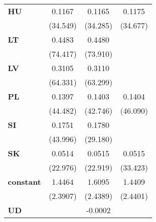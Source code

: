 \documentclass{article}
\begin{document}
\begin{table}[!htbp]
{\begin{tabular}{lccc}
\textbf{HU}            &      0.1167     &         0.1165        &       0.1175       \\
\textbf{ }                     &     (34.549)    &        (34.285)       &      (34.677)      \\
\textbf{LT}            &      0.4483     &         0.4480        &                    \\
\textbf{ }                     &     (74.417)    &        (73.910)       &                    \\
\textbf{LV}            &      0.3105     &         0.3110        &                    \\
\textbf{ }                     &     (64.331)    &        (63.299)       &                    \\
\textbf{PL}            &      0.1397     &         0.1403        &       0.1404       \\
\textbf{ }                     &     (44.482)    &        (42.746)       &      (46.090)      \\
\textbf{SI}            &      0.1751     &         0.1780        &                    \\
\textbf{ }                     &     (43.996)    &        (29.180)       &                    \\
\textbf{SK}            &      0.0514     &         0.0515        &       0.0515       \\
\textbf{ }                     &     (22.976)    &        (22.919)       &      (33.423)      \\
\textbf{constant}                 &      1.4464     &         1.6095        &       1.4409       \\
\textbf{ }                     &     (2.3907)    &        (2.4389)       &      (2.4401)      \\
\textbf{UD}                    &                 &        -0.0002        &                    \\
\bottomrule
\end{tabular}}
\end{table}
\end{document}

